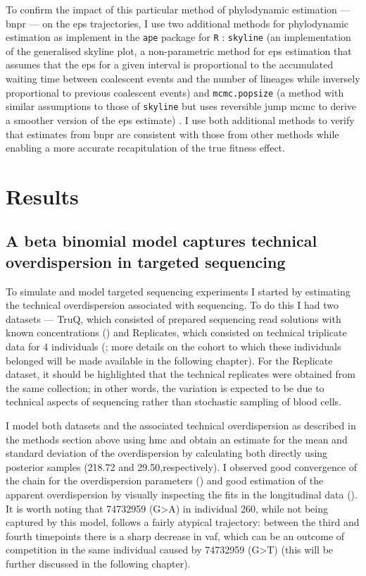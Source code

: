 To confirm the impact of this particular method of phylodynamic estimation --- \ac{bnpr} --- on the \ac{eps} trajectories, I use two additional methods for phylodynamic estimation as implement in the \texttt{ape} package for \texttt{R} \cite{Paradis2019-na}: \texttt{skyline} (an implementation of the generalised skyline plot, a non-parametric method for \ac{eps} estimation that assumes that the \ac{eps} for a given interval is proportional to the accumulated waiting time between coalescent events and the number of lineages while inversely proportional to previous coalescent events) and \texttt{mcmc.popsize} (a method with similar assumptions to those of \texttt{skyline} but uses reversible jump \ac{mcmc} to derive a smoother version of the \ac{eps} estimate) \cite{Opgen-Rhein2005-pi}. I use both additional methods to verify that estimates from \ac{bnpr} are consistent with those from other methods while enabling a more accurate recapitulation of the true fitness effect.

\section{Results}

\subsection{A beta binomial model captures technical overdispersion in targeted sequencing}

To simulate and model targeted sequencing experiments I started by estimating the technical overdispersion associated with sequencing. To do this I had two datasets --- TruQ, which consisted of prepared sequencing read solutions with known concentrations () and Replicates, which consisted on technical triplicate data for 4 individuals (; more details on the cohort to which these individuals belonged will be made available in the following chapter). For the Replicate dataset, it should be highlighted that the technical replicates were obtained from the same collection; in other words, the variation is expected to be due to technical aspects of sequencing rather than stochastic sampling of blood cells. 

I model both datasets and the associated technical overdispersion as described in the methods section above using \ac{hmc} and obtain an estimate for the mean and standard deviation of the overdispersion by calculating both directly using posterior samples (218.72 and 29.50,respectively). I observed good convergence of the chain for the overdispersion parameters () and good estimation of the apparent overdispersion by visually inspecting the fits in the longitudinal data (). It is worth noting that 74732959 (G>A) in individual 260, while not being captured by this model, follows a fairly atypical trajectory: between the third and fourth timepoints there is a sharp decrease in \ac{vaf}, which can be an outcome of competition in the same individual caused by 74732959 (G>T) (this will be further discussed in the following chapter).

